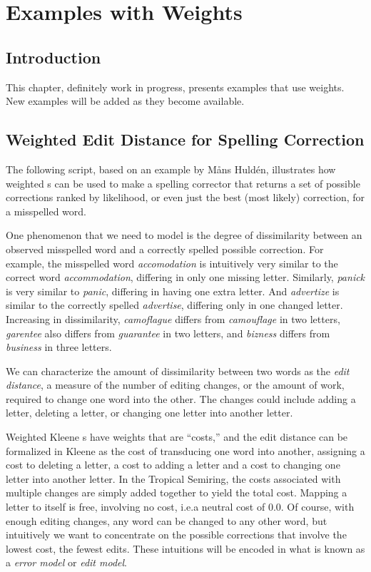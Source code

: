 \chapter{Examples with Weights}

\label{chapt:exampleswithweights}

\section{Introduction}

This chapter, definitely work in progress, presents examples that
use weights.  New examples will be added as they become available.

\section{Weighted Edit Distance for Spelling Correction}

The following script, based on an example by M\r{a}ns Huldén, illustrates how weighted \fst{}s
can be used to make a spelling corrector that returns a set of possible
corrections ranked by likelihood, or even just the best (most likely)
correction, for a misspelled word.

One phenomenon that we need to model is the degree of dissimilarity between an
observed misspelled word and a correctly spelled possible correction.  For example, the misspelled
word \emph{accomodation} is intuitively very similar to the correct word
\emph{accommodation}, differing in only one missing letter.  Similarly,
\emph{panick}
is very similar to \emph{panic}, differing in having one extra letter.  And
\emph{advertize} is similar to the correctly spelled \emph{advertise}, differing only
in one changed letter. Increasing in dissimilarity, \emph{camoflague} differs from
\emph{camouflage} in two letters, \emph{garentee} also differs from
\emph{guarantee} in
two letters, and \emph{bizness} differs from \emph{business} in three letters.

We can characterize the amount of dissimilarity between two words as the \emph{edit distance},
a measure of the number of editing changes, or the amount of work, required to change one word into the
other.  The changes could include adding a letter, deleting a letter, or changing
one letter into another letter.

Weighted Kleene \fst{}s have weights that are ``costs,'' and
the edit distance can be formalized in Kleene as the cost of
transducing one word into another, assigning a cost to deleting a
letter, a cost to adding a letter and a cost to changing one letter into
another letter.  In the Tropical Semiring, the costs associated with multiple changes are simply
added together to yield the total cost.  Mapping a letter to itself is free, involving no cost,
i.e.\@ a neutral cost of 0.0.  Of
course, with
enough editing changes, any word can be changed to any other word,
but intuitively we want to concentrate on the possible corrections that
involve the lowest cost, the fewest edits.  These intuitions will be encoded in what is known 
as a \emph{error model} or \emph{edit model}.

